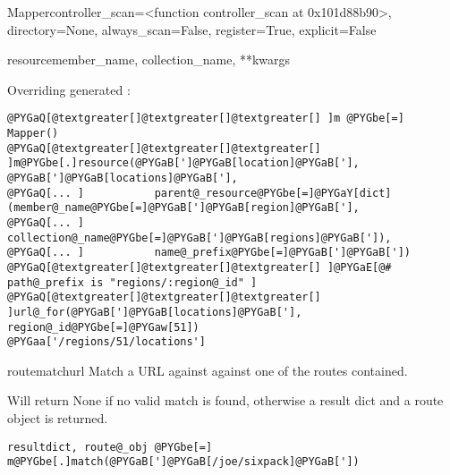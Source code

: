 \documentclass[letterpaper,10pt,english]{manual}
\begin{document}
\begin{classdesc}{Mapper}{controller\_scan=\textless{}function controller\_scan at 0x101d88b90\textgreater{}, directory=None, always\_scan=False, register=True, explicit=False}
\begin{methoddesc}{resource}{member\_name, collection\_name, **kwargs}
\begin{description}
Overriding generated :

\begin{Verbatim}[commandchars=@\[\]]
@PYGaQ[@textgreater[]@textgreater[]@textgreater[] ]m @PYGbe[=] Mapper()
@PYGaQ[@textgreater[]@textgreater[]@textgreater[] ]m@PYGbe[.]resource(@PYGaB[']@PYGaB[location]@PYGaB['], @PYGaB[']@PYGaB[locations]@PYGaB['],
@PYGaQ[... ]           parent@_resource@PYGbe[=]@PYGaY[dict](member@_name@PYGbe[=]@PYGaB[']@PYGaB[region]@PYGaB['],
@PYGaQ[... ]                                collection@_name@PYGbe[=]@PYGaB[']@PYGaB[regions]@PYGaB[']),
@PYGaQ[... ]           name@_prefix@PYGbe[=]@PYGaB[']@PYGaB['])
@PYGaQ[@textgreater[]@textgreater[]@textgreater[] ]@PYGaE[@# path@_prefix is "regions/:region@_id" ]
@PYGaQ[@textgreater[]@textgreater[]@textgreater[] ]url@_for(@PYGaB[']@PYGaB[locations]@PYGaB['], region@_id@PYGbe[=]@PYGaw[51])
@PYGaa['/regions/51/locations']
\end{Verbatim}

\end{description}
\end{methoddesc}

\hypertarget{routes.Mapper.routematch}{}\begin{methoddesc}{routematch}{url}
Match a URL against against one of the routes contained.

Will return None if no valid match is found, otherwise a
result dict and a route object is returned.

\begin{Verbatim}[commandchars=@\[\]]
resultdict, route@_obj @PYGbe[=] m@PYGbe[.]match(@PYGaB[']@PYGaB[/joe/sixpack]@PYGaB['])
\end{Verbatim}
\end{methoddesc}
\end{classdesc}
\end{document}
